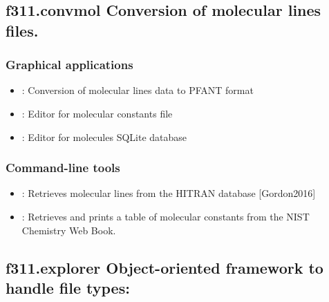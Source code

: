 \documentclass[letterpaper,10pt,english]{sphinxmanual}
\begin{document}
\subsection{f311.convmol \textendash{} Conversion of molecular lines files.}
\label{\detokenize{intro:f311-convmol-conversion-of-molecular-lines-files}}

\subsubsection{Graphical applications}
\label{\detokenize{intro:id1}}\begin{itemize}
\item {} 
{\hyperref[\detokenize{autoscripts/script-convmol::doc}]{}}: Conversion of molecular lines data to PFANT format

\item {} 
{\hyperref[\detokenize{autoscripts/script-mced::doc}]{}}: Editor for molecular constants file

\item {} 
{\hyperref[\detokenize{autoscripts/script-moldbed::doc}]{}}: Editor for molecules SQLite database

\end{itemize}


\subsubsection{Command-line tools}
\label{\detokenize{intro:id2}}\begin{itemize}
\item {} 
{\hyperref[\detokenize{autoscripts/script-hitran-scraper::doc}]{}}: Retrieves molecular lines from the HITRAN database {[}Gordon2016{]}

\item {} 
{\hyperref[\detokenize{autoscripts/script-nist-scraper::doc}]{}}: Retrieves and prints a table of molecular constants from the NIST Chemistry Web Book.

\end{itemize}


\subsection{f311.explorer \textendash{} Object-oriented framework to handle file types:}
\label{\detokenize{intro:f311-explorer-object-oriented-framework-to-handle-file-types}}
\end{document}
